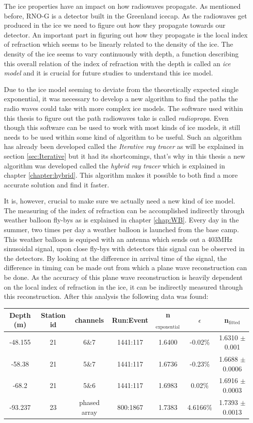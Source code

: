 \documentclass[11pt,a4paper,faculty=we,language=en,doctype=report]{cls/ugent-doc}
\begin{document}
The ice properties have an impact on how radiowaves propagate. As mentioned before, RNO-G is a detector built
in the Greenland icecap. As the radiowaves get produced in the ice we need to figure out how
they propagate towards our detector. An important part in figuring out how they propagate is 
the local index of refraction which seems to be linearly related to the density of the ice. 
The density of the ice seems to vary continuously with depth, a function describing
this overall relation of the index of refraction with the depth is called an \textit{ice model}
and it is crucial for future studies to understand this ice model.

Due to the ice model seeming to deviate from the theoretically expected single exponential, it was necessary to 
develop a new algorithm to find the paths the radio waves could take with more complex ice models. 
The software used within this thesis to figure out the path radiowaves take is called \textit{radiopropa}.
Even though this software can be used to work with most kinds of ice models, it still needs to be used within
some kind of algorithm to be useful. Such an algorithm has already been developed called the \textit{Iterative
ray tracer} as will be explained in section \ref{sec:Iterative} but it had its shortcomings,
that's why in this thesis a new algorithm was developed called the \textit{hybrid ray tracer} which is explained
in chapter \ref{chapter:hybrid}. This algorithm makes it possible to both find a more accurate solution and find it faster.

It is, however, crucial to make sure we actually need a new kind of ice model. The measuring of the index of refraction
can be accomplished indirectly through weather balloon fly-bys as is explained in chapter \ref{chap:WB}. Every day
in the summer, two times per day a weather balloon is launched from the base camp. This weather balloon is equiped with
an antenna which sends out a 403MHz sinusoidal signal, upon close fly-bys with detectors this signal can be observed in the
detectors. By looking at the difference in arrival time of the signal, the difference in timing can be made out from 
which a plane wave reconstruction can be done. As the accuracy of this plane wave reconstruction is heavily dependent
on the local index of refraction in the ice, it can be indirectly measured through this reconstruction.
After this analysis the following data was found:
\begin{center}
\begin{tabular}{||c c c c c c c||}
 \hline
 Depth (m) & Station id & channels & Run:Event & n$_\text{exponential}$ & $\epsilon$ & n$_\text{fitted}$\\ [0.5ex]
 \hline\hline
-48.155 & 21 & 6\&7 & 1441:117 & 1.6400 & -0.02\% & 1.6310 $\pm$ 0.001 \\
 -58.38 & 21 & 5\&7 & 1441:117 & 1.6736 & -0.23\% & 1.6688 $\pm$ 0.0006 \\
 -68.2 & 21 & 5\&6 & 1441:117 & 1.6983 & 0.02\% & 1.6916 $\pm$ 0.0003 \\
 -93.237 & 23 & phased array & 800:1867 & 1.7383 & 4.6166\% & 1.7393 $\pm$ 0.0013 \\
 \hline
\end{tabular}
\end{center}
\end{document}
